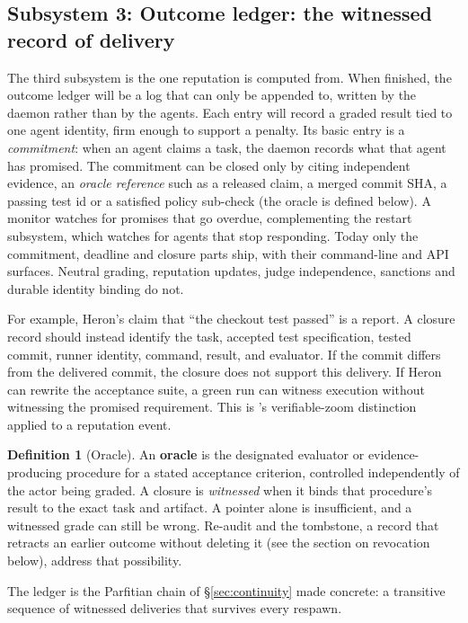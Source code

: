 \documentclass[11pt,a4paper]{article}
\theoremstyle{definition}
\newtheorem{definition}{Definition}[section]
\begin{document}

\subsection{Subsystem 3: Outcome ledger: the witnessed record of delivery}

The third subsystem is the one reputation is computed from. When finished, the
outcome ledger will be a log that can only be appended to, written by the
daemon rather than by the agents. Each entry will record a graded result tied
to one agent identity, firm enough to support a penalty. Its basic entry is a
\emph{commitment}: when an agent claims a task, the daemon records what that
agent has promised. The commitment can be closed only by citing independent
evidence, an \emph{oracle reference} such as a released claim, a merged commit
SHA, a passing test id or a satisfied policy sub-check (the oracle is defined
below). A monitor watches for promises that go overdue, complementing the
restart subsystem, which watches for agents that stop responding. Today only
the commitment, deadline and closure parts ship, with their command-line and
API surfaces. Neutral grading, reputation updates, judge independence,
sanctions and durable identity binding do not.

For example, Heron's claim that ``the checkout test passed'' is a report. A closure record should instead identify the task, accepted test specification, tested commit, runner identity, command, result, and evaluator. If the commit differs from the delivered commit, the closure does not support this delivery. If Heron can rewrite the acceptance suite, a green run can witness execution without witnessing the promised requirement. This is 's verifiable-zoom distinction applied to a reputation event.

\begin{definition}[Oracle]\label{def:oracle}
\setlength{\parskip}{4pt plus 1pt}
An \textbf{oracle} is the designated evaluator or evidence-producing
procedure for a stated acceptance criterion, controlled independently of the
actor being graded. A closure is \emph{witnessed} when it binds that
procedure's result to the exact task and artifact. A pointer alone is
insufficient, and a witnessed grade can still be wrong. Re-audit and the
tombstone, a record that retracts an earlier outcome without deleting
it (see the section on revocation below), address that possibility.

The ledger is the Parfitian chain of \S\ref{sec:continuity}
made concrete: a transitive sequence of witnessed deliveries that survives every
respawn.
\end{definition}
\end{document}
